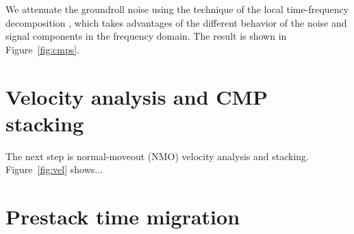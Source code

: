 We attenuate the groundroll noise using the technique of the local
time-frequency decomposition \cite[]{liu2013seismic}, which takes
advantages of the different behavior of the noise and signal
components in the frequency domain. The result is shown in
Figure~\ref{fig:cmps}.

\section{Velocity analysis and CMP stacking}

The next step is normal-moveout (NMO) velocity analysis and
stacking. Figure~\ref{fig:vel} shows...


\section{Prestack time migration}




